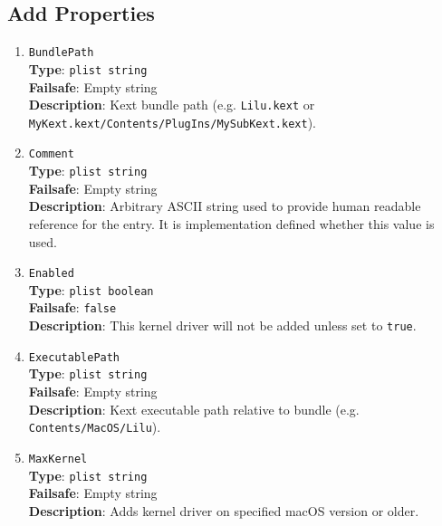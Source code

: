 \documentclass[]{article}
\begin{document}
\subsection{Add Properties}\label{kernelpropsadd}

\begin{enumerate}
\item
  \texttt{BundlePath}\\
  \textbf{Type}: \texttt{plist\ string}\\
  \textbf{Failsafe}: Empty string\\
  \textbf{Description}: Kext bundle path (e.g. \texttt{Lilu.kext}
  or \texttt{MyKext.kext/Contents/PlugIns/MySubKext.kext}).

\item
  \texttt{Comment}\\
  \textbf{Type}: \texttt{plist\ string}\\
  \textbf{Failsafe}: Empty string\\
  \textbf{Description}: Arbitrary ASCII string used to provide human readable
  reference for the entry. It is implementation defined whether this value is
  used.

\item
  \texttt{Enabled}\\
  \textbf{Type}: \texttt{plist\ boolean}\\
  \textbf{Failsafe}: \texttt{false}\\
  \textbf{Description}: This kernel driver will not be added unless set to
  \texttt{true}.

\item
  \texttt{ExecutablePath}\\
  \textbf{Type}: \texttt{plist\ string}\\
  \textbf{Failsafe}: Empty string\\
  \textbf{Description}: Kext executable path relative to bundle
  (e.g. \texttt{Contents/MacOS/Lilu}).

\item
  \texttt{MaxKernel}\\
  \textbf{Type}: \texttt{plist\ string}\\
  \textbf{Failsafe}: Empty string\\
  \textbf{Description}: Adds kernel driver on specified macOS version or older.


\end{enumerate}
\end{document}
